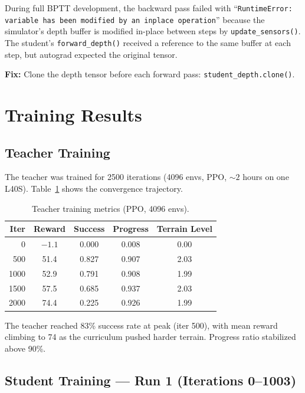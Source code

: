 \documentclass[11pt,a4paper]{article}
\begin{document}
During full BPTT development, the backward pass failed with
``\texttt{RuntimeError: variable has been modified by an inplace operation}''
because the simulator's depth buffer is modified in-place between steps by
\texttt{update\_sensors()}. The student's \texttt{forward\_depth()} received a
reference to the same buffer at each step, but autograd expected the original
tensor.

\textbf{Fix:} Clone the depth tensor before each forward pass:
\texttt{student\_depth.clone()}.

\section{Training Results}

\subsection{Teacher Training}

The teacher was trained for 2500 iterations (4096 envs, PPO, ${\sim}2$ hours on
one L40S). Table~\ref{tab:teacher} shows the convergence trajectory.

\begin{table}[ht]
\centering
\caption{Teacher training metrics (PPO, 4096 envs).}
\label{tab:teacher}
\begin{tabular}{rcccc}
\toprule
Iter & Reward & Success & Progress & Terrain Level \\
\midrule
0    & $-1.1$ & 0.000 & 0.008 & 0.00 \\
500  & 51.4   & 0.827 & 0.907 & 2.03 \\
1000 & 52.9   & 0.791 & 0.908 & 1.99 \\
1500 & 57.5   & 0.685 & 0.937 & 2.03 \\
2000 & 74.4   & 0.225 & 0.926 & 1.99 \\
\bottomrule
\end{tabular}
\end{table}

The teacher reached 83\% success rate at peak (iter 500), with mean reward
climbing to 74 as the curriculum pushed harder terrain. Progress ratio stabilized
above 90\%.

\subsection{Student Training --- Run 1 (Iterations 0--1003)}
\end{document}
